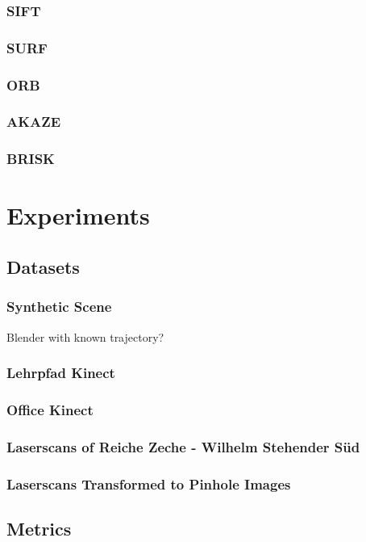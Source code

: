 \subsubsection{SIFT}
\subsubsection{SURF}
\subsubsection{ORB}
\subsubsection{AKAZE}
\subsubsection{BRISK}

\section{Experiments}

\subsection{Datasets}
\subsubsection{Synthetic Scene}
Blender with known trajectory?
\subsubsection{Lehrpfad Kinect}
\subsubsection{Office Kinect}
\subsubsection{Laserscans of Reiche Zeche - Wilhelm Stehender Süd}
\subsubsection{Laserscans Transformed to Pinhole Images}

\subsection{Metrics}

